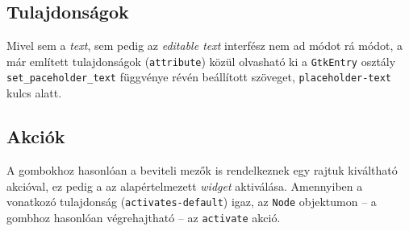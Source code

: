 \subsection{Tulajdonságok}

Mivel sem a \textit{text}, sem pedig az \textit{editable text} interfész nem ad módot rá módot, a már említett tulajdonságok (\texttt{attribute}) közül olvasható ki a \texttt{GtkEntry} osztály \texttt{set\_paceholder\_text} függvénye révén beállított szöveget, \texttt{placeholder-text} kulcs alatt.

\subsection{Akciók}

A gombokhoz hasonlóan a beviteli mezők is rendelkeznek egy rajtuk kiváltható akcióval, ez pedig a az alapértelmezett \textit{widget} aktiválása. Amennyiben a vonatkozó tulajdonság (\texttt{activates-default}) igaz, az \texttt{Node} objektumon -- a gombhoz hasonlóan végrehajtható -- az \texttt{activate} akció.
